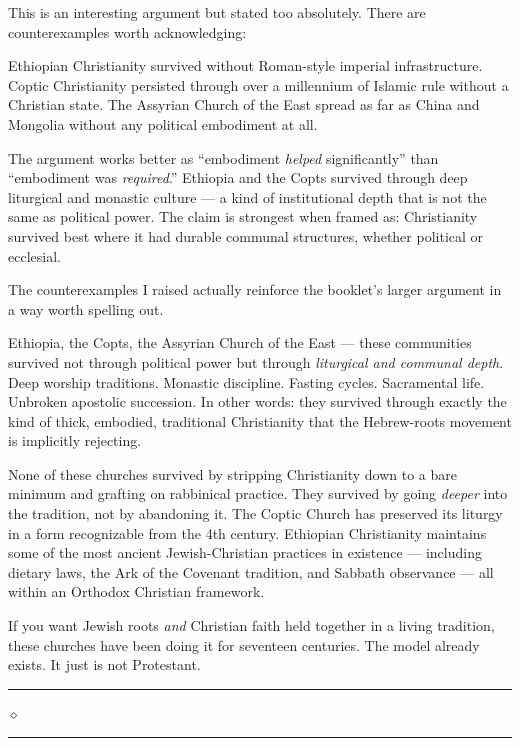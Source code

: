 \documentclass[10pt,twoside,openany]{book}
\newcommand{\ornrule}{%
  \par\bigskip
  {\noindent\hfil{\color{gold}\rule[0.5ex]{1.5in}{0.5pt}%
  \quad$\diamond$\quad%
  \rule[0.5ex]{1.5in}{0.5pt}}\hfil\par}%
  \bigskip
}
\begin{document}
\begin{reviewerbox}
This is an interesting argument but stated too
absolutely. There are counterexamples worth
acknowledging:

Ethiopian Christianity survived without Roman-style
imperial infrastructure. Coptic Christianity persisted
through over a millennium of Islamic rule without a
Christian state. The Assyrian Church of the East spread
as far as China and Mongolia without any political
embodiment at all.

The argument works better as ``embodiment \emph{helped}
significantly'' than ``embodiment was \emph{required}.''
Ethiopia and the Copts survived through deep liturgical
and monastic culture --- a kind of institutional depth
that is not the same as political power. The claim is
strongest when framed as: Christianity survived best
where it had durable communal structures, whether
political or ecclesial.
\end{reviewerbox}

\begin{westernbox}
The counterexamples I raised actually reinforce the
booklet's larger argument in a way worth spelling out.

Ethiopia, the Copts, the Assyrian Church of the East ---
these communities survived not through political power
but through \emph{liturgical and communal depth}. Deep
worship traditions. Monastic discipline. Fasting
cycles. Sacramental life. Unbroken apostolic
succession. In other words: they survived through
exactly the kind of thick, embodied, traditional
Christianity that the Hebrew-roots movement is
implicitly rejecting.

None of these churches survived by stripping
Christianity down to a bare minimum and grafting on
rabbinical practice. They survived by going \emph{deeper}
into the tradition, not by abandoning it. The Coptic
Church has preserved its liturgy in a form recognizable
from the 4th century. Ethiopian Christianity maintains
some of the most ancient Jewish-Christian practices in
existence --- including dietary laws, the Ark of the
Covenant tradition, and Sabbath observance --- all within
an Orthodox Christian framework.

If you want Jewish roots \emph{and} Christian faith held
together in a living tradition, these churches have
been doing it for seventeen centuries. The model
already exists. It just is not Protestant.
\end{westernbox}

\ornrule
\end{document}
